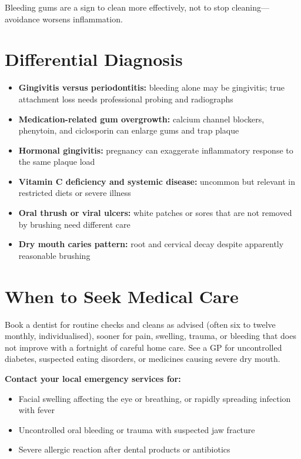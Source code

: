 Bleeding gums are a sign to clean more effectively, not to stop cleaning---avoidance worsens inflammation.

\section*{Differential Diagnosis}
\begin{itemize}
    \item \textbf{Gingivitis versus periodontitis:} bleeding alone may be gingivitis; true attachment loss needs professional probing and radiographs
    \item \textbf{Medication-related gum overgrowth:} calcium channel blockers, phenytoin, and ciclosporin can enlarge gums and trap plaque
    \item \textbf{Hormonal gingivitis:} pregnancy can exaggerate inflammatory response to the same plaque load
    \item \textbf{Vitamin C deficiency and systemic disease:} uncommon but relevant in restricted diets or severe illness
    \item \textbf{Oral thrush or viral ulcers:} white patches or sores that are not removed by brushing need different care
    \item \textbf{Dry mouth caries pattern:} root and cervical decay despite apparently reasonable brushing
\end{itemize}

\section*{When to Seek Medical Care}
Book a dentist for routine checks and cleans as advised (often six to twelve monthly, individualised), sooner for pain, swelling, trauma, or bleeding that does not improve with a fortnight of careful home care. See a GP for uncontrolled diabetes, suspected eating disorders, or medicines causing severe dry mouth.

\textbf{Contact your local emergency services for:}
\begin{itemize}
    \item Facial swelling affecting the eye or breathing, or rapidly spreading infection with fever
    \item Uncontrolled oral bleeding or trauma with suspected jaw fracture
    \item Severe allergic reaction after dental products or antibiotics
\end{itemize}

